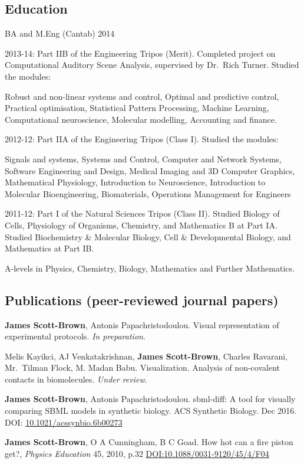 \documentclass[letterpaper]{article}
\renewenvironment{itemize}{
  \begin{compactitem}{}{
    \setlength{\leftmargin}{1.5em}
  }
}{
  \end{compactitem}
}
\begin{document}
\subsection{Education}\label{education}

\begin{itemize}
\item
  BA and M.Eng (Cantab) 2014
\item
  2013-14: Part IIB of the Engineering Tripos (Merit). Completed project
  on Computational Auditory Scene Analysis, supervised by Dr.~Rich
  Turner. Studied the modules:

  Robust and non-linear systems and control, Optimal and predictive
  control, Practical optimisation, Statistical Pattern Processing,
  Machine Learning, Computational neuroscience, Molecular modelling,
  Accounting and finance.
\item
  2012-12: Part IIA of the Engineering Tripos (Class I). Studied the
  modules:

  Signals and systems, Systems and Control, Computer and Network
  Systems, Software Engineering and Design, Medical Imaging and 3D
  Computer Graphics, Mathematical Physiology, Introduction to
  Neuroscience, Introduction to Molecular Bioengineering, Biomaterials,
  Operations Management for Engineers
\item
  2011-12: Part I of the Natural Sciences Tripos (Class II). Studied
  Biology of Cells, Physiology of Organisms, Chemistry, and Mathematics
  B at Part IA. Studied Biochemistry \& Molecular Biology, Cell \&
  Developmental Biology, and Mathematics at Part IB.
\item
  A-levels in Physics, Chemistry, Biology, Mathematics and Further
  Mathematics.
\end{itemize}

\subsection{Publications (peer-reviewed journal
papers)}\label{publications-peer-reviewed-journal-papers}

\begin{itemize}
\item
  \textbf{James Scott-Brown}, Antonis Papachristodoulou. Visual
  representation of experimental protocols. \emph{In preparation}.
\item
  Melis Kayikci, AJ Venkatakrishnan, \textbf{James Scott-Brown}, Charles
  Ravarani, Mr.~Tilman Flock, M. Madan Babu. Visualization. Analysis of
  non-covalent contacts in biomolecules. \emph{Under review}.
\item
  \textbf{James Scott-Brown}, Antonis Papachristodoulou. sbml-diff: A
  tool for visually comparing SBML models in synthetic biology. ACS
  Synthetic Biology. Dec 2016. DOI:
  \href{http://dx.doi.org/10.1021/acssynbio.6b00273}{10.1021/acssynbio.6b00273}
\item
  \textbf{James Scott-Brown}, O A Cunningham, B C Goad. How hot can a
  fire piston get?, \emph{Physics Education} 45, 2010, p.32
  \href{http://dx.doi.org/10.1088/0031-9120/45/4/F04}{DOI:10.1088/0031-9120/45/4/F04}
\end{itemize}
\end{document}
